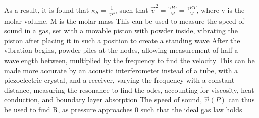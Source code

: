 \documentclass[11 pt, twoside]{article}
\newenvironment{outline*}
{
	\begin{outline}[enumerate]
	}
	{\end{outline}
}
\begin{document}
\begin{outline*}
\3 As a result, it is found that $\kappa_S = \frac{1}{\gamma P}$, such that $\vec{v}^2 = \frac{\gamma P v}{M} = \frac{\gamma RT}{M}$, where v is the molar volume, M is the molar mass
\3 This can be used to measure the speed of sound in a gas, set with a movable piston with powder inside, vibrating the piston after placing it in such a position to create a standing wave
\4 After the vibration begins, powder piles at the nodes, allowing measurement of half a wavelength between, multiplied by the frequency to find the velocity
\4 This can be made more accurate by an acoustic interferometer instead of a tube, with a piezoelectric crystal, and a receiver, varying the frequency with a constant distance, measuring the resonance to find the odes, accounting for viscosity, heat conduction, and boundary layer absorption
\4 The speed of sound, $\vec{v}(P)$ can thus be used to find R, as pressure approaches 0 such that the ideal gas law holds
\end{outline*}
\end{document}
